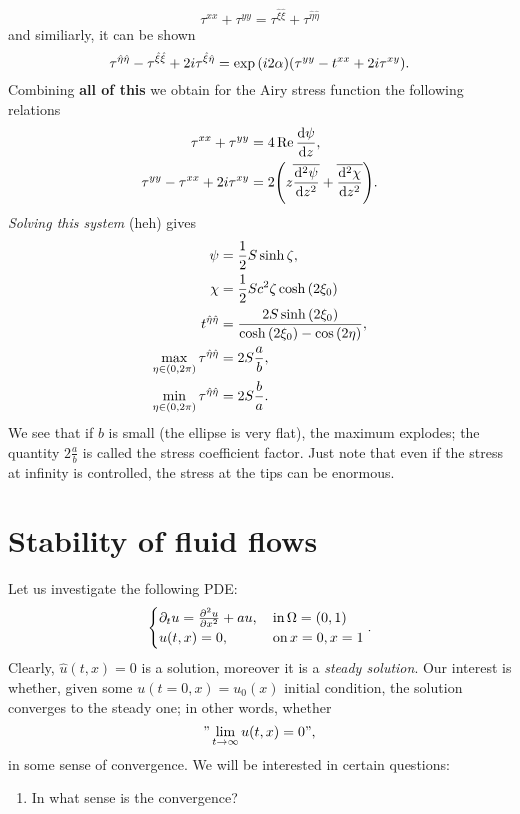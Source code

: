 \documentclass[reqno, a4paper]{article}
\begin{document}
\[
	\tau^{xx}+\tau^{yy}=\tau^{\hat{\xi}\hat{\xi}}+\tau^{\hat{\eta}\hat{\eta}}
\]
and similiarly, it can be shown
\[
	\tau^{\hat{\eta}\hat{\eta}}-\tau^{\hat{\xi}\hat{\xi}}+2i \tau^{\hat{\xi}\hat{\eta}} = \exp\qty(i 2 \alpha)\qty(\tau^{yy}-t^{xx}+2i \tau^{xy}).
\]
Combining \textbf{all of this} we obtain for the Airy stress function the following relations 
\begin{align*}
	\tau^{xx} + \tau^{yy} &= 4 \Re \dv{\psi}{z},\\
	\tau^{yy} - \tau^{xx} + 2 i \tau^{xy} &= 2\qty(z \overline{\dv[2]{\psi}{z}} + \overline{\dv[2]{\chi}{z}}).
\end{align*}
\textit{Solving this system} (heh) gives 
\begin{align*}
	\psi &= \frac{1}{2}S \sinh \zeta, \\
	\chi & = \frac{1}{2}S c^{2} \zeta \cosh\qty(2 \xi_0) \\
	t^{\hat{\eta}\hat{\eta}} &= \frac{2 S \sinh \qty(2\xi_0)}{\cosh\qty(2 \xi_0) - \cos \qty(2 \eta)}, \\
	\max_{\eta \in (0,2 \pi)} \tau^{\hat{\eta}\hat{\eta}} &= 2 S \frac{a}{b}, \\
	\min_{\eta \in (0,2 \pi)} \tau^{\hat{\eta}\hat{\eta}} &= 2 S \frac{b}{a}.
\end{align*}
We see that if $b$ is small (the ellipse is very flat), the maximum explodes; the quantity $2\frac{a}{b}$ is called the stress coefficient factor. Just note that even if the stress at infinity is controlled, the stress at the tips can be enormous.

\section{Stability of fluid flows}
\label{sec:stability}

Let us investigate the following PDE:
\[
	\begin{cases}
		\partial_t u = \pdv[2]{u}{x} + au, & \, \text{in} \, \Omega = (0,1) \\
		u(t,x) = 0, & \, \text{on} \, x=0, x=1
	\end{cases}.
\]
Clearly, $\hat{u}(t,x) = 0$ is a solution, moreover it is a \textit{steady solution}. Our interest is whether, given some $u(t=0,x) = u_0(x)$ initial condition, the solution converges to the steady one; in other words, whether
\[
	" \lim_{t \to \infty}u(t,x) = 0",
\]
in some sense of convergence. We will be interested in certain questions:

\begin{enumerate}
	\item In what sense is the convergence?
\end{enumerate}
\end{document}
